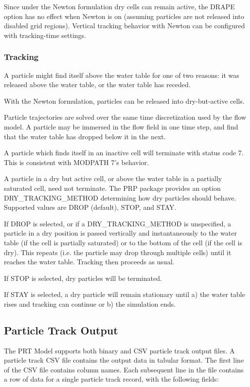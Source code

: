 Since under the Newton formulation dry cells can remain active, the DRAPE option has no effect when Newton is on (assuming particles are not released into disabled grid regions). Vertical tracking behavior with Newton can be configured with tracking-time settings.

\subsubsection{Tracking}

A particle might find itself above the water table for one of two reasons: it was released above the water table, or the water table has receded.

With the Newton formulation, particles can be released into dry-but-active cells.

Particle trajectories are solved over the same time discretization used by the flow model. A particle may be immersed in the flow field in one time step, and find that the water table has dropped below it in the next.

A particle which finds itself in an inactive cell will terminate with status code 7. This is consistent with MODPATH 7's behavior.

A particle in a dry but active cell, or above the water table in a partially saturated cell, need not terminate. The PRP package provides an option DRY\_TRACKING\_METHOD determining how dry particles should behave. Supported values are DROP (default), STOP, and STAY.

If DROP is selected, or if a DRY\_TRACKING\_METHOD is unspecified, a particle in a dry position is passed vertically and instantaneously to the water table (if the cell is partially saturated) or to the bottom of the cell (if the cell is dry). This repeats (i.e. the particle may drop through multiple cells) until it reaches the water table. Tracking then proceeds as usual.

If STOP is selected, dry particles will be terminated.

If STAY is selected, a dry particle will remain stationary until a) the water table rises and tracking can continue or b) the simulation ends.

\subsection{Particle Track Output}

The PRT Model supports both binary and CSV particle track output files. A particle track CSV file contains the output data in tabular format. The first line of the CSV file contains column names. Each subsequent line in the file contains a row of data for a single particle track record, with the following fields:

